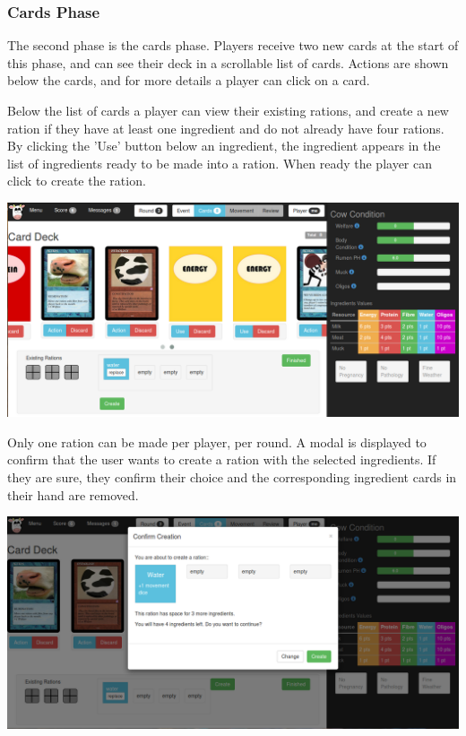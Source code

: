 \subsubsection{Cards Phase}
The second phase is the cards phase. Players receive two new cards at the start of this phase, and can see their deck in a scrollable list of cards. Actions are shown below the cards, and for more details a player can click on a card.

Below the list of cards a player can view their existing rations, and create a new ration if they have at least one ingredient and do not already have four rations. By clicking the 'Use' button below an ingredient, the ingredient appears in the list of ingredients ready to be made into a ration. When ready the player can click to create the ration.
\begin{center}
	\includegraphics[width=\textwidth]{Images/app3/ui-phase-cards}
\end{center}

Only one ration can be made per player, per round. A modal is displayed to confirm that the user wants to create a ration with the selected ingredients. If they are sure, they confirm their choice and the corresponding ingredient cards in their hand are removed.
\begin{center}
	\includegraphics[width=\textwidth]{Images/app3/ui-phase-cards-create}
\end{center}

